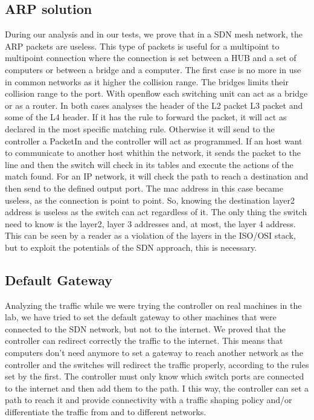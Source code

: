 \documentclass[article,10pt]{IEEEtran}
\begin{document}
\subsection{ARP solution}
During our analysis and in our tests, we prove that in a SDN mesh network, the ARP packets are useless.
This type of packets is useful for a multipoint to multipoint connection where the connection is set between a
HUB and a set of computers or between a bridge and a computer. The first case is no more in use in common networks as
it higher the collision range. The bridges limits their collision range to the port. With openflow each switching unit can
act as a bridge or as a router. In both cases analyses the header of the L2 packet L3 packet and some of the L4 header.
If it has the rule to forward the packet, it will act as declared in the most specific matching rule. Otherwise it will
send to the controller a PacketIn and the controller will act as programmed. If an host want to communicate to another host whithin
the network, it sends the packet to the line and then the switch will check in its tables and execute the actions of the match found.
For an IP network, it will check the path to reach a destination and then send to the defined output port. The mac address in this case
became useless, as the connection is point to point. So, knowing the destination layer2 address is useless as the switch can act
regardless of it. The only thing the switch need to know is the layer2, layer 3 addresses and, at most, the layer 4 address.
This can be seen by a reader as a violation of the layers in the ISO/OSI stack, but to exploit the potentials of the SDN approach,
this is necessary.

\subsection{Default Gateway}

Analyzing the traffic while we were trying the controller on real machines in the lab, we have tried to set the default gateway to
other machines that were connected to the SDN network, but not to the internet. We proved that the controller can redirect correctly the
traffic to the internet. This means that
computers don't need anymore to set a gateway to reach another network as the controller and the switches will redirect the traffic
properly, according to the rules set by the first. The controller must only know which switch ports are connected to the
internet and then add them to the path. I this way, the controller can set a path to reach it and provide connectivity with
a traffic shaping policy and/or differentiate the traffic from and to different networks.
\end{document}
